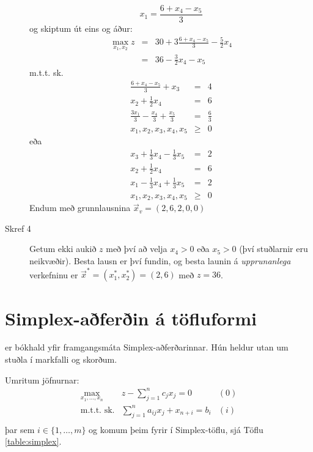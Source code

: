 \begin{lausn}
\begin{description}
$$x_1 = \frac{6 + x_4 - x_5}{3}$$
og skiptum út eins og áður:
\begin{eqnarray*}
\max_{x_1,x_2}  z  & = & 30+3\frac{6 + x_4 - x_5}{3} - \frac{5}{2}x_4 \\
 & =& 36-\frac{3}{2}x_4-x_5
\end{eqnarray*}
m.t.t. sk.
\begin{eqnarray*}
 \frac{6 + x_4 - x_5}{3} + x_3 & =& 4 \\
 x_2 + \frac{1}{2}x_4 & =& 6\\
 \frac{3x_1}{3} -\frac{x_4}{3} +\frac{x_5}{3} & = & \frac{6}{3}\\
 x_1, x_2, x_3, x_4, x_5 &\ge& 0 
\end{eqnarray*}
eða
\begin{eqnarray*}
 x_3+\frac{1}{3}x_4 - \frac{1}{3}x_5  & = &2 \\
 x_2 + \frac{1}{2}x_4 & =& 6\\
 x_1 -\frac{1}{3}x_4 +\frac{1}{3}x_5 & =& 2\\
 x_1, x_2, x_3, x_4, x_5 &\ge& 0 
\end{eqnarray*}
Endum með grunnlausnina $\vec{x}_v=(2,6,2,0,0)$
\item[Skref 4] Getum ekki aukið $z$ með því að velja $x_4>0$ eða $x_5>0$ (því stuðlarnir eru neikvæðir). Besta lausn er því fundin, og besta launin á \emph{upprunanlega} verkefninu er $\vec{x}^*=(x_1^*,x_2^*)=(2,6)$ með $z=36$.
\end{description}

\end{lausn}

\section{Simplex-aðferðin á töfluformi}
 er bókhald yfir framgangsmáta Simplex-aðferðarinnar. Hún heldur utan um stuðla í markfalli og skorðum.

Umritum jöfnurnar:
\setcounter{equation}{0}
\begin{eqnarray*}
\max_{x_1,\ldots,x_n} & z - \sum_{j=1}^n c_j
x_j = 0  & (0)\\
\mbox{m.t.t. sk.} & \sum_{j=1}^n a_{ij} x_j + x_{n+i} =  b_i
& (i)\\
\end{eqnarray*}
þar sem $i\in\{1,\ldots,m\}$ og komum þeim fyrir í Simplex-töflu, sjá Töflu \ref{table:simplex}.

